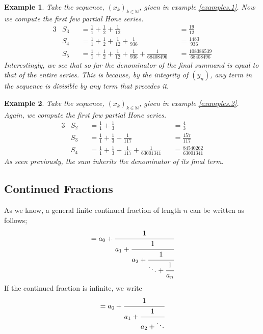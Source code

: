 \documentclass{article}
\newtheorem{example}{Example}[section]
\theoremstyle{remark}
\theoremstyle{definition}
\begin{document}
\begin{example}\label{sum.example.1}
Take the sequence, $(x_k)_{k\in\mathbb{N}}$, given in example \ref{examples.1}. Now we compute the first few partial Hone series.
\begin{alignat*}{3}
    & S_3 &&= \frac{1}{1} + \frac{1}{2} + \frac{1}{12} &&= \frac{19}{12} \\
    & S_4 &&= \frac{1}{1} + \frac{1}{2} + \frac{1}{12} + \frac{1}{936} &&= \frac{1483}{936} \\
    & S_5 &&= \frac{1}{1} + \frac{1}{2} + \frac{1}{12} + \frac{1}{936} + \frac{1}{68408496} &&= \frac{108386539}{68408496}
\end{alignat*}
Interestingly, we see that so far the denominator of the final summand is equal to that of the entire series. This is because, by the integrity of $(y_n)$, any term in the sequence is divisible by any term that precedes it.
\end{example}

\begin{example}\label{sum.example.2}
Take the sequence, $(x_k)_{k\in\mathbb{N}}$, given in example \ref{examples.2}. Again, we compute the first few partial Hone series.
\begin{alignat*}{3}
    & S_2 &&= \frac{1}{1} + \frac{1}{3} &&= \frac{4}{3} \\
    & S_3 &&= \frac{1}{1} + \frac{1}{3} + \frac{1}{117} &&= \frac{157}{117} \\
    & S_4 &&= \frac{1}{1} + \frac{1}{3} + \frac{1}{117} + \frac{1}{63001341} &&= \frac{84540262}{63001341}
\end{alignat*}
As seen previously, the sum inherits the denominator of its final term.
\end{example}

\subsection{Continued Fractions}\label{cfrac}

As we know, a general finite continued fraction of length $n$ can be written as follows;
\begin{equation}
    [a_0;a_1,a_2,\dots,a_n] = a_0 + \cfrac{1}{a_1 + \cfrac{1}{a_2 + \cfrac{1}{\ddots + \cfrac{1}{a_n}}}}
\end{equation}
If the continued fraction is infinite, we write
\begin{equation}
    [a_0;a_1,a_2,\dots] = a_0 + \cfrac{1}{a_1 + \cfrac{1}{a_2 + \ddots}}
\end{equation}
\end{document}
